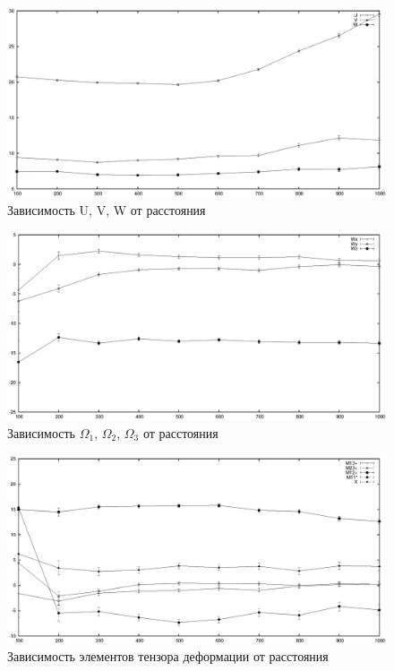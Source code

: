 \documentclass[14pt]{article} %
\begin{document}
\begin{figure}[h!]
\includegraphics[width=1\linewidth]{./graphs/UVW100.eps}
\caption*{Зависимость U, V, W от расстояния}
\end{figure}

\begin{figure}[h!]
\includegraphics[width=1\linewidth]{./graphs/Omega100.eps}
\caption*{Зависимость $\Omega_1$, $\Omega_2$, $\Omega_3$ от расстояния}
\end{figure}
\begin{figure}[h!]
\includegraphics[width=1\linewidth]{./graphs/M100.eps}
\caption*{Зависимость элементов тензора деформации от расстояния}
\end{figure}
\end{document}
